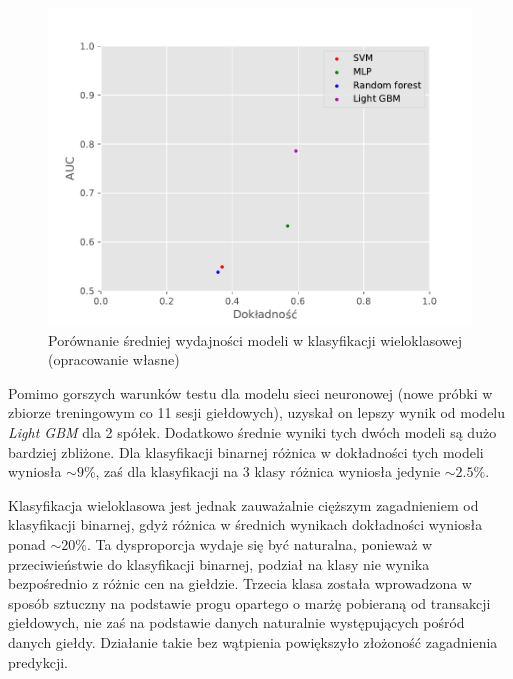\documentclass[a4paper, twoside, 11pt, openright]{article}
\begin{document}
\begin{figure}[H]
\centering \includegraphics[scale=0.9]{img/summary-discrete-summary.pdf}
\caption{Porównanie średniej wydajności modeli w klasyfikacji wieloklasowej (opracowanie własne)}
\label{img:summary-discrete}
\end{figure}


Pomimo gorszych warunków testu dla modelu sieci neuronowej (nowe próbki w zbiorze treningowym co 11 sesji giełdowych), uzyskał on lepszy wynik od modelu \textit{Light GBM} dla 2 spółek. Dodatkowo średnie wyniki tych dwóch modeli są dużo bardziej zbliżone. Dla klasyfikacji binarnej różnica w dokładności tych modeli wyniosła $\sim 9\%$, zaś dla klasyfikacji na 3 klasy różnica wyniosła jedynie $\sim 2.5\%$. 

\bigskip

Klasyfikacja wieloklasowa jest jednak zauważalnie cięższym zagadnieniem od klasyfikacji binarnej, gdyż różnica w średnich wynikach dokładności wyniosła ponad $\sim 20\%$. Ta dysproporcja wydaje się być naturalna, ponieważ w przeciwieństwie do klasyfikacji binarnej, podział na klasy nie wynika bezpośrednio z różnic cen na giełdzie. Trzecia klasa została wprowadzona w sposób sztuczny na podstawie progu opartego o marżę pobieraną od transakcji giełdowych, nie zaś na podstawie danych naturalnie występujących pośród danych giełdy. Działanie takie bez wątpienia powiększyło złożoność zagadnienia predykcji.

\bigskip
\end{document}
